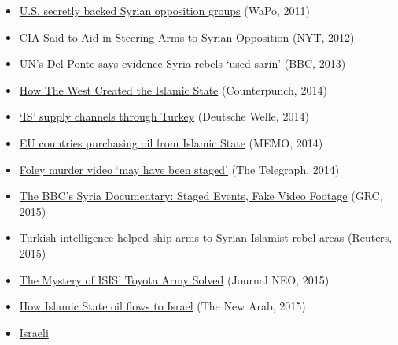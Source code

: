 \begin{itemize}
\tightlist
\item
  \href{https://www.washingtonpost.com/world/us-secretly-backed-syrian-opposition-groups-cables-released-by-wikileaks-show/2011/04/14/AF1p9hwD_story.html}{U.S.
  secretly backed Syrian opposition groups} (WaPo, 2011)
\item
  \href{https://www.nytimes.com/2012/06/21/world/middleeast/cia-said-to-aid-in-steering-arms-to-syrian-rebels.html}{CIA
  Said to Aid in Steering Arms to Syrian Opposition} (NYT, 2012)
\item
  \href{https://www.bbc.com/news/world-middle-east-22424188}{UN's Del
  Ponte says evidence Syria rebels `used sarin'} (BBC, 2013)
\item
  \href{https://www.counterpunch.org/2014/09/12/how-the-west-created-the-islamic-state/}{How
  The West Created the Islamic State} (Counterpunch, 2014)
\item
  \href{https://www.dw.com/en/is-supply-channels-through-turkey/av-18091048}{`IS'
  supply channels through Turkey} (Deutsche Welle, 2014)
\item
  \href{https://www.middleeastmonitor.com/20140903-eu-ambassador-to-iraq-accuses-european-countries-of-purchasing-oil-from-islamic-state/}{EU
  countries purchasing oil from Islamic State} (MEMO, 2014)
\item
  \href{https://www.telegraph.co.uk/journalists/bill-gardner/11054488/Foley-murder-video-may-have-been-staged.html}{Foley
  murder video `may have been staged'} (The Telegraph, 2014)
\item
  \href{https://www.globalresearch.ca/the-bbc-saving-syrias-children-documentary-staged-events-fake-video-footage/5470158}{The
  BBC's Syria Documentary: Staged Events, Fake Video Footage} (GRC,
  2015)
\item
  \href{https://www.reuters.com/article/us-mideast-crisis-turkey-arms-idUSKBN0O61L220150521}{Turkish
  intelligence helped ship arms to Syrian Islamist rebel areas}
  (Reuters, 2015)
\item
  \href{https://journal-neo.org/2015/10/09/the-mystery-of-isis-toyota-army-solved/}{The
  Mystery of ISIS' Toyota Army Solved} (Journal NEO, 2015)
\item
  \href{https://www.alaraby.co.uk/english/features/2015/11/26/raqqas-rockefellers-how-islamic-state-oil-flows-to-israel}{How
  Islamic State oil flows to Israel} (The New Arab, 2015)
\item
  \href{https://www.dailymail.co.uk/news/article-3315347/Watch-heart-pounding-moment-Israeli-commandos-save-Islamic-militants-Syrian-warzone-risking-lives-sworn-enemies.html}{Israeli
}
\end{itemize}

